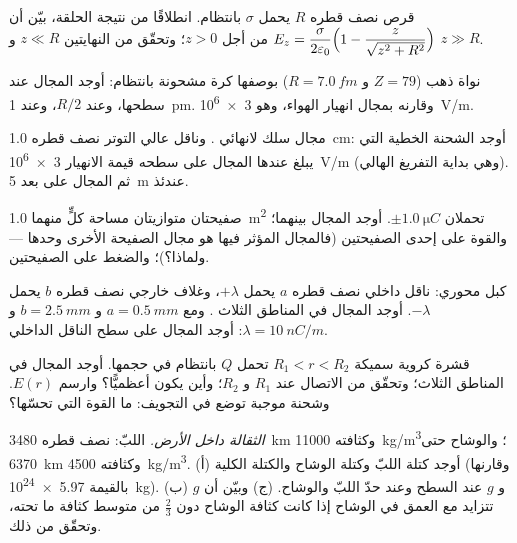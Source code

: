 \begin{exercise}[$\star\star$]\label{exo:b1:electrostatics-gauss:5}
قرص نصف قطره $R$ يحمل $\sigma$ بانتظام. انطلاقًا من نتيجة الحلقة،
بيّن أن $E_z = \dfrac{\sigma}{2\varepsilon_0}\Bigl(1 - \dfrac{z}{\sqrt{z^2 +
R^2}}\Bigr)$ من أجل $z > 0$؛ وتحقّق من النهايتين $z \ll R$ و $z \gg R$.
\end{exercise}

\begin{exercise}[$\star\star$]\label{exo:b1:electrostatics-gauss:6}
نواة ذهب ($Z = 79$ و $R = \qty{7.0}{fm}$) بوصفها كرة مشحونة
بانتظام: أوجد المجال عند سطحها، وعند $R/2$، وعند \qty{1}{pm}. وقارنه
بمجال انهيار الهواء، وهو \qty{3e6}{V/m}.
\end{exercise}

\begin{exercise}[$\star\star$]\label{exo:b1:electrostatics-gauss:7}
مجال سلك لانهائي . وناقل عالي التوتر نصف
قطره \qty{1.0}{cm}: أوجد الشحنة الخطية التي يبلغ عندها المجال على سطحه
قيمة الانهيار \qty{3e6}{V/m} (وهي بداية التفريغ الهالي). ثم المجال على بعد
\qty{5}{m} عندئذ.
\end{exercise}

\begin{exercise}[$\star\star$]\label{exo:b1:electrostatics-gauss:8}
صفيحتان متوازيتان مساحة كلٍّ منهما \qty{1.0}{m^2} تحملان $\pm\qty{1.0}{\micro C}$.
أوجد المجال بينهما؛ والقوة على إحدى الصفيحتين (فالمجال المؤثر فيها هو
مجال الصفيحة الأخرى وحدها --- ولماذا؟)؛ والضغط على الصفيحتين.
\end{exercise}

\begin{exercise}[$\star\star$]\label{exo:b1:electrostatics-gauss:9}
كبل محوري: ناقل داخلي نصف قطره $a$ يحمل $+\lambda$، وغلاف
خارجي نصف قطره $b$ يحمل $-\lambda$. أوجد المجال في المناطق الثلاث . ومع $a = \qty{0.5}{mm}$ و $b = \qty{2.5}{mm}$ و $\lambda = \qty{10}{nC/m}$:
أوجد المجال على سطح الناقل الداخلي.
\end{exercise}

\begin{exercise}[$\star\star\star$]\label{exo:b1:electrostatics-gauss:10}
قشرة كروية سميكة $R_1 < r < R_2$ تحمل $Q$ بانتظام في
حجمها. أوجد المجال في المناطق الثلاث؛ وتحقّق من الاتصال عند $R_1$ و
$R_2$؛ وأين يكون أعظميًّا؟ وارسم $E(r)$. وشحنة موجبة توضع
في التجويف: ما القوة التي تحسّها؟
\end{exercise}

\begin{exercise}[$\star\star\star$]\label{exo:b1:electrostatics-gauss:11}
\emph{الثقالة داخل الأرض.} اللبّ: نصف قطره \qty{3480}{km} وكثافته
\qty{11000}{kg/m^3}؛ والوشاح حتى \qty{6370}{km} وكثافته \qty{4500}{kg/m^3}.
(أ) أوجد كتلة اللبّ وكتلة الوشاح والكتلة الكلية (وقارنها بالقيمة \qty{5.97e24}{kg}).
(ب) و $g$ عند السطح وعند حدّ اللبّ والوشاح. (ج) وبيّن أن
$g$ تتزايد مع العمق في الوشاح إذا كانت كثافة الوشاح دون
$\tfrac23$ من متوسط كثافة ما تحته، وتحقّق من ذلك.
\end{exercise}

